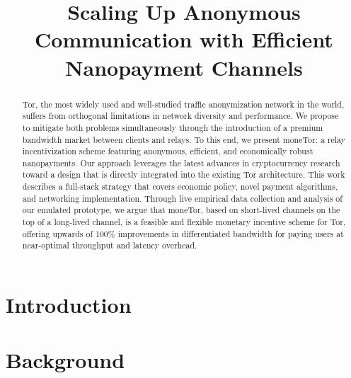 \documentclass[USenglish,oneside,twocolumn]{article}
\begin{document}
 

\title{\huge Scaling Up Anonymous Communication with Efficient Nanopayment Channels} %


\begin{abstract}
  { Tor, the most widely used and well-studied traffic anonymization network in
    the world, suffers from orthogonal limitations in network diversity and
    performance. We propose to mitigate both problems simultaneously through the
    introduction of a premium bandwidth market between clients and relays. To
    this end, we present moneTor: a relay incentivization scheme featuring
    anonymous, efficient, and economically robust nanopayments. Our approach
    leverages the latest advances in cryptocurrency research toward a design
    that is directly integrated into the existing Tor architecture. This work
    describes a full-stack strategy that covers economic policy, novel payment
    algorithms, and networking implementation. Through live empirical data
    collection and analysis of our emulated prototype, we argue that moneTor,
    based on short-lived channels on the top of a long-lived channel, is a
    feasible and flexible monetary incentive scheme for Tor, offering upwards of
    100\% improvements in differentiated bandwidth for paying users at
    near-optimal throughput and latency overhead. }
\end{abstract}



  
  
 \maketitle


\section{Introduction}
\label{sec:introduction}


\section{Background}
\label{sec:background}

\end{document}
